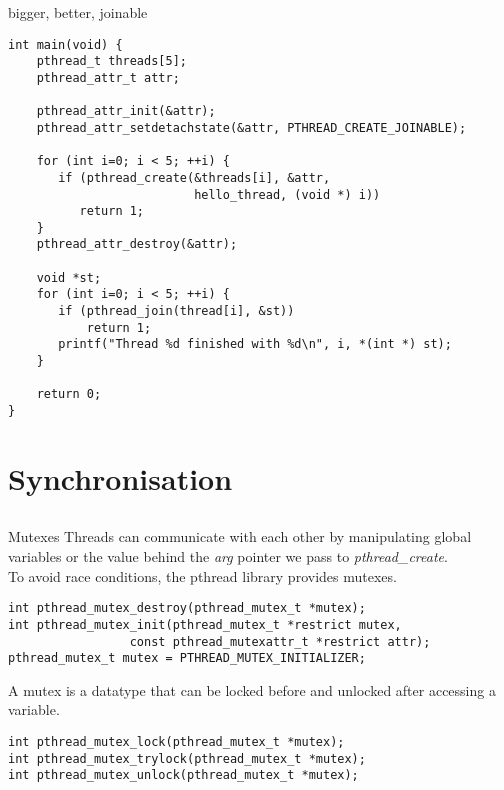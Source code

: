 \begin{frame}[fragile = singleslide]{bigger, better, joinable}
    \begin{lstlisting}[basicstyle=\scriptsize]
int main(void) {
    pthread_t threads[5];
    pthread_attr_t attr;
    
    pthread_attr_init(&attr);
    pthread_attr_setdetachstate(&attr, PTHREAD_CREATE_JOINABLE);
    
    for (int i=0; i < 5; ++i) {
       if (pthread_create(&threads[i], &attr,
                          hello_thread, (void *) i))
          return 1;
    }
    pthread_attr_destroy(&attr);

    void *st;
    for (int i=0; i < 5; ++i) {
       if (pthread_join(thread[i], &st))
           return 1;
       printf("Thread %d finished with %d\n", i, *(int *) st);
    }
    
    return 0;
}
\end{lstlisting}
\end{frame}

\section{Synchronisation}
\subsection{}
\begin{frame}[fragile = singleslide]{Mutexes}
    Threads can communicate with each other by manipulating global variables or the value behind the \textit{arg} pointer we pass to \textit{pthread\_create}.\\
    To avoid race conditions, the pthread library provides mutexes.
    \begin{lstlisting}[numbers=none]
int pthread_mutex_destroy(pthread_mutex_t *mutex);
int pthread_mutex_init(pthread_mutex_t *restrict mutex,
                 const pthread_mutexattr_t *restrict attr);
pthread_mutex_t mutex = PTHREAD_MUTEX_INITIALIZER;
\end{lstlisting}
    \bigskip
    A mutex is a datatype that can be locked before and unlocked after accessing a variable.
    \begin{lstlisting}[numbers=none]
int pthread_mutex_lock(pthread_mutex_t *mutex);
int pthread_mutex_trylock(pthread_mutex_t *mutex);
int pthread_mutex_unlock(pthread_mutex_t *mutex);
\end{lstlisting}
\end{frame}

